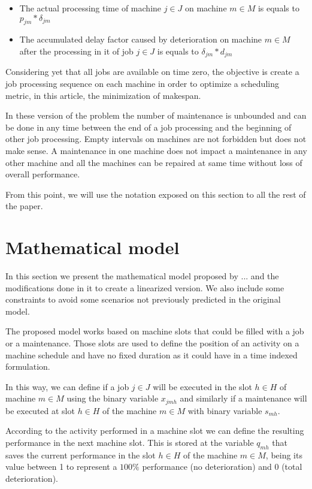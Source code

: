 \documentclass[a4paper,11pt]{article}
\begin{document}
\begin{itemize}
\item{  The actual processing time of machine $j \in J$ on machine $m \in M$ is equals to $p_{jm}*\delta_{jm}$ }

\item{ The accumulated delay factor caused by deterioration on machine $m \in M$ after the processing in it of job $j \in J$ is equals to $\delta_{jm}*d_{jm}$}
\end{itemize}

Considering yet that all jobs are available on time zero, the objective is create a job processing sequence on each machine in order to optimize a scheduling metric, in this article, the minimization of makespan. 

In these version of the problem the number of maintenance is unbounded and can be done in any time between the end of a job processing and the beginning of other job processing. Empty intervals on machines are not forbidden but does not make sense. A maintenance in one machine does not impact a maintenance in any other machine and all the machines can be repaired at same time without loss of overall performance. 

From this point, we will use the notation exposed on this section to all the rest of the paper. 


\section{Mathematical model}

In this section we present the mathematical model proposed by ... and the modifications done in it to create a linearized version. We also include some constraints to avoid some scenarios not previously predicted in the original model.

The proposed model works based on machine slots that could be filled with a job or a maintenance. Those slots are used to define the position of an activity on a machine schedule and have no fixed duration as it could have in a time indexed formulation. 

In this way, we can define if a job $j \in J$ will be executed in the slot $h \in H$ of machine $m \in M$  using the binary variable $x_{jmh}$ and similarly if a maintenance will be executed at slot $h \in H$ of the machine $m \in M$ with binary variable $s_{mh}$.

According to the activity performed in a machine slot we can define the resulting performance in the next machine slot. This is stored at the variable $q_{mh}$ that saves the current performance in the slot $h \in H$ of the machine $m \in M$, being its value between 1 to represent a $100\%$ performance (no deterioration) and 0 (total deterioration).
\end{document}
